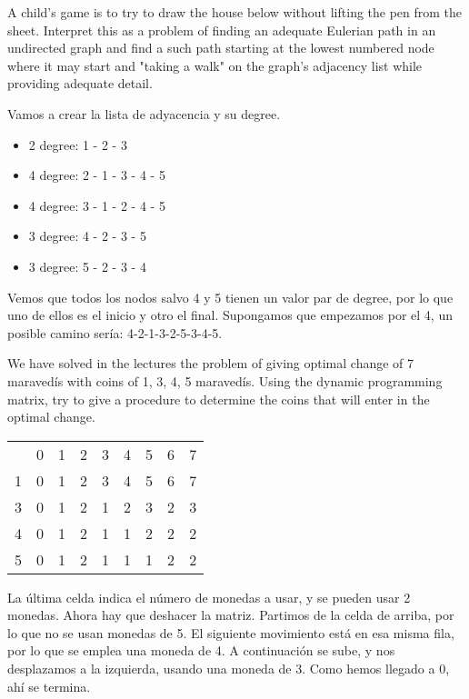 \documentclass[nochap]{config/ejercicios}
\begin{document}
\begin{problemS} 
A child's game is to try to draw the house below without lifting the pen from the sheet. Interpret this as a problem of finding an adequate Eulerian path in an undirected graph and find a such path starting at the lowest numbered node where it may start and "taking a walk" on the graph's adjacency list while providing adequate detail.

Vamos a crear la lista de adyacencia y su degree.
\begin{itemize}
\item 2 degree: 1 - 2 - 3
\item 4 degree: 2 - 1 - 3 - 4 - 5
\item 4 degree: 3 - 1 - 2 - 4 - 5
\item 3 degree: 4 - 2 - 3 - 5
\item 3 degree: 5 - 2 - 3 - 4
\end{itemize}
Vemos que todos los nodos salvo 4 y 5 tienen un valor par de degree, por lo que uno de ellos es el inicio y otro el final. Supongamos que empezamos por el 4, un posible camino sería: 4-2-1-3-2-5-3-4-5.
\end{problemS}

\begin{problemS} 
We have solved in the lectures the problem of giving optimal change of 7 maravedís with coins of 1, 3, 4, 5 maravedís. Using the dynamic programming matrix, try to give a procedure to determine the coins that will enter in the optimal change.

\begin{table}[h]
\centering
\begin{tabular}{c c c c c c c c c}
& 0 & 1 & 2 & 3 & 4 & 5 & 6 & 7 \\
1 & 0 & 1 & 2 & 3 & 4 & 5 & 6 & 7\\
3 & 0 & 1 & 2 & 1 & 2 & 3 & 2 & 3\\
4 & 0 & 1 & 2 & 1 & 1 & 2 & 2 & 2\\
5 & 0 & 1 & 2 & 1 & 1 & 1 & 2 & 2\\
\end{tabular}
\end{table}
La última celda indica el número de monedas a usar, y se pueden usar 2 monedas. Ahora hay que deshacer la matriz. Partimos de la celda de arriba, por lo que no se usan monedas de 5. El siguiente movimiento está en esa misma fila, por lo que se emplea una moneda de 4. A continuación se sube, y nos desplazamos a la izquierda, usando una moneda de 3. Como hemos llegado a 0, ahí se termina.
\end{problemS}
\end{document}
